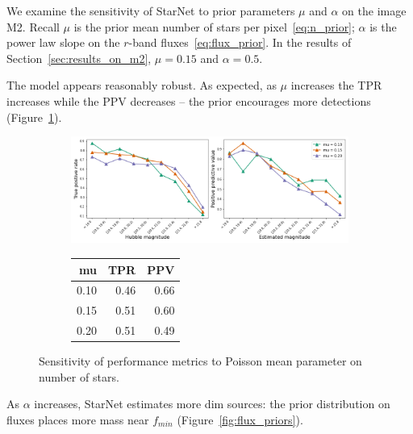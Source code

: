 We examine the sensitivity of StarNet to prior parameters $\mu$ and $\alpha$ on the image M2. 
Recall $\mu$ is the prior mean number of stars per pixel~\eqref{eq:n_prior};
$\alpha$ is the power law slope on the $r$-band fluxes~\eqref{eq:flux_prior}. 
In the results of Section~\ref{sec:results_on_m2}, $\mu=0.15$ and  $\alpha = 0.5$. 

The model appears reasonably robust. 
As expected, as $\mu$ increases the TPR increases while the PPV decreases  -- the prior encourages more detections (Figure~\ref{fig:mu_sensitivity}). 

\begin{figure}[ht]
\begin{subfigure}{\textwidth}
\centering
\includegraphics[width = \textwidth]{figures/prior_sensitivity/prior_mu_sensitivty.png}
\end{subfigure}
\begin{subfigure}{\textwidth}
\begin{center}
\begin{tabular}{rrr}
\toprule
     mu &   TPR &   PPV \\
\midrule
 0.10 &  0.46 &  0.66 \\
 0.15 &  0.51 &  0.60 \\
 0.20 &  0.51 &  0.49 \\
\bottomrule
\end{tabular}
\par\vspace{0pt}
\end{center}
\end{subfigure}\hfill
\caption{Sensitivity of performance metrics to Poisson mean parameter on number of stars. }
\label{fig:mu_sensitivity}
\end{figure}

As $\alpha$ increases, StarNet estimates more dim sources: the prior distribution on fluxes places more mass near $f_{min}$ (Figure~\ref{fig:flux_priors}). 


